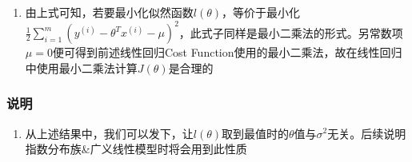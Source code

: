 \begin{enumerate}
	\item 由上式可知，若要最小化似然函数$l(\theta)$，等价于最小化$\frac{1}{2} \sum_{i=1}^{m}\left(y^{(i)}-\theta^Tx^{(i)}-\mu\right)^2$，此式子同样是最小二乘法的形式。另常数项$\mu = 0$便可得到前述线性回归Cost Function使用的最小二乘法，故在线性回归中使用最小二乘法计算$J(\theta)$是合理的

\end{enumerate}

\subsubsection{说明}
\begin{enumerate}
	\item 从上述结果中，我们可以发下，让$l(\theta)$取到最值时的$\theta$值与$\sigma^2$无关。后续说明指数分布族\&广义线性模型时将会用到此性质
\end{enumerate}













